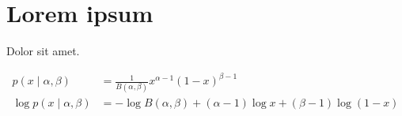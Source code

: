 \documentclass[main.tex]{subfiles}
\begin{document}
\section{Lorem ipsum}

Dolor sit amet\cite{LoremIpsum2018}.

\begin{align}
    p\left(x \mid \alpha, \beta \right)
     & = \frac{
             1
         }{
             B(\alpha, \beta)
         }
         x^{\alpha - 1} {(1 - x)}^{\beta - 1}
    \\
    \log p\left(x \mid \alpha, \beta \right)
     & = - \log B(\alpha, \beta)
       + (\alpha - 1) \log x
       + (\beta - 1) \log (1 - x)
\end{align}
\end{document}
